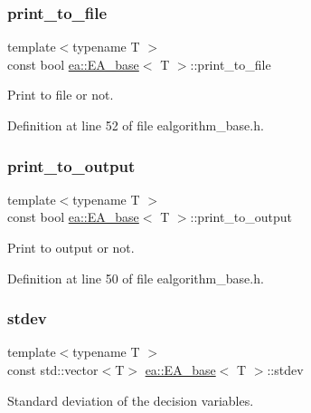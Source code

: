 \subsubsection{\texorpdfstring{print\+\_\+to\+\_\+file}{print\_to\_file}}
{\footnotesize\ttfamily template$<$typename T $>$ \\
const bool \hyperlink{structea_1_1_e_a__base}{ea\+::\+E\+A\+\_\+base}$<$ T $>$\+::print\+\_\+to\+\_\+file}



Print to file or not. 



Definition at line 52 of file ealgorithm\+\_\+base.\+h.

\mbox{\label{structea_1_1_e_a__base_aea758485e2120469ca02c52c7cff9e5a}} 
\subsubsection{\texorpdfstring{print\+\_\+to\+\_\+output}{print\_to\_output}}
{\footnotesize\ttfamily template$<$typename T $>$ \\
const bool \hyperlink{structea_1_1_e_a__base}{ea\+::\+E\+A\+\_\+base}$<$ T $>$\+::print\+\_\+to\+\_\+output}



Print to output or not. 



Definition at line 50 of file ealgorithm\+\_\+base.\+h.

\mbox{\label{structea_1_1_e_a__base_a28216728d1e1355337d8bf2a484d5569}} 
\subsubsection{\texorpdfstring{stdev}{stdev}}
{\footnotesize\ttfamily template$<$typename T $>$ \\
const std\+::vector$<$T$>$ \hyperlink{structea_1_1_e_a__base}{ea\+::\+E\+A\+\_\+base}$<$ T $>$\+::stdev}



Standard deviation of the decision variables. 



